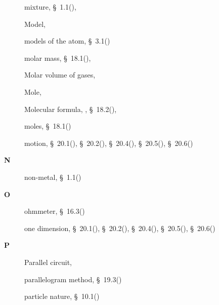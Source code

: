 \begin{multicols}{2}
{\begin{description}
	  \item[] \noindent\raggedright mixture,  \S~1.1(\pageref{m38708}),  \pageref{id2405672}
	  
	  \item[] \noindent\raggedright Model,  \pageref{id2414493}
	  
	  \item[] \noindent\raggedright models of the atom,  \S~3.1(\pageref{m38756})
	  
	  \item[] \noindent\raggedright molar mass,  \S~18.1(\pageref{m38717}),  \pageref{id2496969}
	  
	  \item[] \noindent\raggedright Molar volume of gases,  \pageref{id2504818}
	  
	  \item[] \noindent\raggedright Mole,  \pageref{id2496528}
	  
	  \item[] \noindent\raggedright Molecular formula,  \pageref{id2456697},  \S~18.2(\pageref{m38712}),  \pageref{id2501878}
	  
	  \item[] \noindent\raggedright moles,  \S~18.1(\pageref{m38717})
	  
	  \item[] \noindent\raggedright motion,  \S~20.1(\pageref{m38787}),  \S~20.2(\pageref{m38788}),  \S~20.4(\pageref{m38794}),  \S~20.5(\pageref{m38795}),  \S~20.6(\pageref{m38796})
	  \vspace{.3cm}
	  \item[{\large \bfseries N}]\noindent\raggedright
	  non-metal,  \S~1.1(\pageref{m38708})
	  \vspace{.3cm}
	  \item[{\large \bfseries O}]\noindent\raggedright
	  ohmmeter,  \S~16.3(\pageref{m38773})
	  
	  \item[] \noindent\raggedright one dimension,  \S~20.1(\pageref{m38787}),  \S~20.2(\pageref{m38788}),  \S~20.4(\pageref{m38794}),  \S~20.5(\pageref{m38795}),  \S~20.6(\pageref{m38796})
	  \vspace{.3cm}
	  \item[{\large \bfseries P}]\noindent\raggedright
	  Parallel circuit,  \pageref{id2478767}
	  
	  \item[] \noindent\raggedright parallelogram method,  \S~19.3(\pageref{m38815})
	  
	  \item[] \noindent\raggedright particle nature,  \S~10.1(\pageref{m38777})
	  

\end{description}}
\end{multicols}
